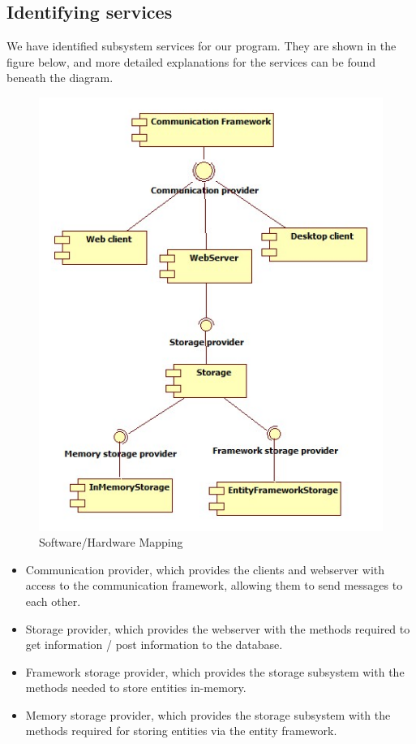 \subsection{Identifying services}
We have identified subsystem services for our program. They are shown in the figure below, and more detailed explanations for the services can be found beneath the diagram.

\begin{figure}[H]
\includegraphics[scale=0.8]{img/SDD/SubsystemServices.jpg}
\caption{Software/Hardware Mapping}
\label{fig:Subsystem Services}
\end{figure}


\begin{itemize}
	\item Communication provider, which provides the clients and webserver with access to the communication framework, allowing them to send messages to each other.
	\item Storage provider, which provides the webserver with the methods required to get information / post information to the database.
	\item Framework storage provider, which provides the storage subsystem with the methods needed to store entities in-memory.
	\item Memory storage provider, which provides the storage subsystem with the methods required for storing entities via the entity framework.
\end{itemize}

